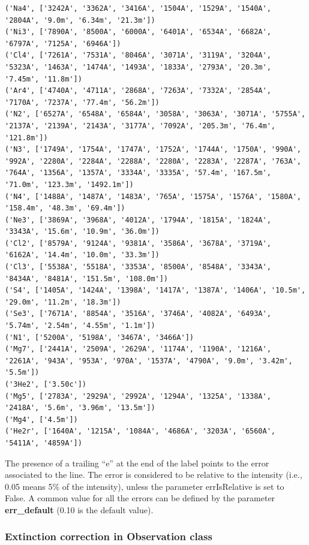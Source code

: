 \documentclass[11pt]{article}
\begin{document}
\begin{Verbatim}[commandchars=\\\{\}]
('Na4', ['3242A', '3362A', '3416A', '1504A', '1529A', '1540A', '2804A', '9.0m', '6.34m', '21.3m'])
('Ni3', ['7890A', '8500A', '6000A', '6401A', '6534A', '6682A', '6797A', '7125A', '6946A'])
('Cl4', ['7261A', '7531A', '8046A', '3071A', '3119A', '3204A', '5323A', '1463A', '1474A', '1493A', '1833A', '2793A', '20.3m', '7.45m', '11.8m'])
('Ar4', ['4740A', '4711A', '2868A', '7263A', '7332A', '2854A', '7170A', '7237A', '77.4m', '56.2m'])
('N2', ['6527A', '6548A', '6584A', '3058A', '3063A', '3071A', '5755A', '2137A', '2139A', '2143A', '3177A', '7092A', '205.3m', '76.4m', '121.8m'])
('N3', ['1749A', '1754A', '1747A', '1752A', '1744A', '1750A', '990A', '992A', '2280A', '2284A', '2288A', '2280A', '2283A', '2287A', '763A', '764A', '1356A', '1357A', '3334A', '3335A', '57.4m', '167.5m', '71.0m', '123.3m', '1492.1m'])
('N4', ['1488A', '1487A', '1483A', '765A', '1575A', '1576A', '1580A', '158.4m', '48.3m', '69.4m'])
('Ne3', ['3869A', '3968A', '4012A', '1794A', '1815A', '1824A', '3343A', '15.6m', '10.9m', '36.0m'])
('Cl2', ['8579A', '9124A', '9381A', '3586A', '3678A', '3719A', '6162A', '14.4m', '10.0m', '33.3m'])
('Cl3', ['5538A', '5518A', '3353A', '8500A', '8548A', '3343A', '8434A', '8481A', '151.5m', '108.0m'])
('S4', ['1405A', '1424A', '1398A', '1417A', '1387A', '1406A', '10.5m', '29.0m', '11.2m', '18.3m'])
('Se3', ['7671A', '8854A', '3516A', '3746A', '4082A', '6493A', '5.74m', '2.54m', '4.55m', '1.1m'])
('N1', ['5200A', '5198A', '3467A', '3466A'])
('Mg7', ['2441A', '2509A', '2629A', '1174A', '1190A', '1216A', '2261A', '943A', '953A', '970A', '1537A', '4790A', '9.0m', '3.42m', '5.5m'])
('3He2', ['3.50c'])
('Mg5', ['2783A', '2929A', '2992A', '1294A', '1325A', '1338A', '2418A', '5.6m', '3.96m', '13.5m'])
('Mg4', ['4.5m'])
('He2r', ['1640A', '1215A', '1084A', '4686A', '3203A', '6560A', '5411A', '4859A'])

    \end{Verbatim}

    The presence of a trailing ``e'' at the end of the label points to the
error associated to the line. The error is considered to be relative to
the intensity (i.e., 0.05 means 5\% of the intensity), unless the
parameter errIsRelative is set to False. A common value for all the
errors can be defined by the parameter \textbf{err\_default} (0.10 is
the default value).

    \subsubsection{Extinction correction in Observation class}
\end{document}
